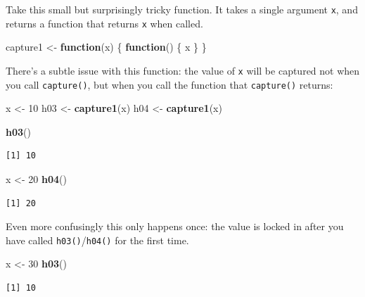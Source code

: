 \documentclass[]{book}
\newenvironment{Shaded}{\begin{snugshade}}{\end{snugshade}}
\newcommand{\ControlFlowTok}[1]{\textcolor[rgb]{0.13,0.29,0.53}{\textbf{#1}}}
\newcommand{\DecValTok}[1]{\textcolor[rgb]{0.00,0.00,0.81}{#1}}
\newcommand{\KeywordTok}[1]{\textcolor[rgb]{0.13,0.29,0.53}{\textbf{#1}}}
\newcommand{\NormalTok}[1]{#1}
\newcommand{\StringTok}[1]{\textcolor[rgb]{0.31,0.60,0.02}{#1}}
\theoremstyle{definition}
\theoremstyle{definition}
\theoremstyle{definition}
\theoremstyle{remark}
\begin{document}
Take this small but surprisingly tricky function. It takes a single
argument \texttt{x}, and returns a function that returns \texttt{x} when
called.

\begin{Shaded}
\begin{Highlighting}[]
\NormalTok{capture1 <-}\StringTok{ }\ControlFlowTok{function}\NormalTok{(x) \{}
  \ControlFlowTok{function}\NormalTok{() \{}
\NormalTok{    x}
\NormalTok{  \}}
\NormalTok{\}}
\end{Highlighting}
\end{Shaded}

There's a subtle issue with this function: the value of \texttt{x} will
be captured not when you call \texttt{capture()}, but when you call the
function that \texttt{capture()} returns:

\begin{Shaded}
\begin{Highlighting}[]
\NormalTok{x <-}\StringTok{ }\DecValTok{10}
\NormalTok{h03 <-}\StringTok{ }\KeywordTok{capture1}\NormalTok{(x)}
\NormalTok{h04 <-}\StringTok{ }\KeywordTok{capture1}\NormalTok{(x)}

\KeywordTok{h03}\NormalTok{()}
\end{Highlighting}
\end{Shaded}

\begin{verbatim}
[1] 10
\end{verbatim}

\begin{Shaded}
\begin{Highlighting}[]
\NormalTok{x <-}\StringTok{ }\DecValTok{20}
\KeywordTok{h04}\NormalTok{()}
\end{Highlighting}
\end{Shaded}

\begin{verbatim}
[1] 20
\end{verbatim}

Even more confusingly this only happens once: the value is locked in
after you have called \texttt{h03()}/\texttt{h04()} for the first time.

\begin{Shaded}
\begin{Highlighting}[]
\NormalTok{x <-}\StringTok{ }\DecValTok{30}
\KeywordTok{h03}\NormalTok{()}
\end{Highlighting}
\end{Shaded}

\begin{verbatim}
[1] 10
\end{verbatim}
\end{document}
